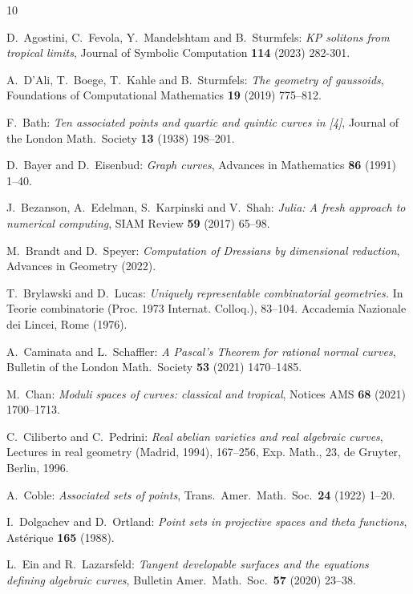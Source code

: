 \documentclass[12pt]{extarticle}
\theoremstyle{definition}
\numberwithin{theorem}{section}
\theoremstyle{plain}\newtheorem{ithm}{Theorem}
\begin{document}
\begin{thebibliography}{10}
\begin{small}
\setlength{\itemsep}{-0.6mm}

    
 D.~Agostini, C.~Fevola, Y.~Mandelshtam and B.~Sturmfels:
 {\em KP solitons from tropical limits}, 
Journal of Symbolic Computation {\bf 114} (2023) 282-301.   

  A.~D'Ali, T.~Boege, T.~Kahle and B.~Sturmfels:
 {\em The geometry of gaussoids},
 Foundations of Computational Mathematics {\bf 19} (2019) 775--812.

F.~Bath: {\em Ten associated points and quartic and quintic curves in [4]},
Journal of the London Math.~Society {\bf 13} (1938) 198--201.

  D.~Bayer and D.~Eisenbud:   {\em Graph curves},
Advances in Mathematics {\bf 86} (1991) 1--40.

 J.~Bezanson, A.~Edelman, S.~Karpinski and V.~Shah: {\em Julia: A fresh approach to numerical computing}, SIAM Review {\bf 59} (2017) 65--98.

M.~Brandt and D.~Speyer: {\em Computation of Dressians by dimensional reduction},
Advances in Geometry (2022).
 
T.~Brylawski and D.~Lucas: {\em Uniquely representable combinatorial geometries.} In Teorie combinatorie (Proc. 1973 Internat. Colloq.), 83--104. Accademia Nazionale dei Lincei, Rome (1976).
 
 A.~Caminata and L.~Schaffler:
 {\em A Pascal's Theorem for rational normal curves},
Bulletin of the London Math.~Society {\bf 53} (2021) 1470--1485.
 
 M.~Chan:
{\em Moduli spaces of curves: classical and tropical},
Notices AMS {\bf 68} (2021) 1700--1713.

C.~Ciliberto and C.~Pedrini: {\em Real abelian varieties and real algebraic curves},
Lectures in real geometry (Madrid, 1994), 167--256,  Exp. Math., 23, de Gruyter, Berlin, 1996. 

 A.~Coble: {\em Associated sets of points}, Trans.~Amer.~Math.~Soc.~{\bf 24} (1922) 1--20.
 
 I.~Dolgachev and D.~Ortland: {\em Point sets
  in projective spaces and theta functions},  Ast\'erique {\bf 165} (1988).

 L.~Ein and R.~Lazarsfeld:
{\em Tangent developable surfaces and the equations
defining algebraic curves},
Bulletin Amer.~Math.~Soc.~{\bf 57} (2020) 23--38.


\end{small}
\end{thebibliography}
\end{document}
